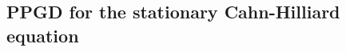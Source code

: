 \documentclass{amsart}
\newcommand{\Hm}{{\mathring H_{\mathrm{per}}^{-1}}}
\newcommand{\Homz}{{\mathring{H}_{\mathrm{per}}^{1}}}
\newcommand{\LL}{\mathcal{L}}
\newcommand{\norm}[2]{\left\| #1 \right\| _{#2}}
\newcommand{\HH}{\mathbb{H}}
\theoremstyle{definition}
\newtheorem{rmk}[thm]{Remark}
\begin{document}



\subsection{PPGD for the stationary Cahn-Hilliard equation}
\end{document}
